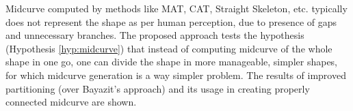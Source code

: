 
Midcurve computed by methods like MAT, CAT, Straight Skeleton, etc. typically does not represent the shape as per human perception, due to presence of gaps and unnecessary branches.  The proposed approach tests the hypothesis (Hypothesis \ref{hyp:midcurve}) that instead of computing midcurve of the whole shape in one go, one can divide the shape in more manageable, simpler shapes, for which midcurve generation is a way simpler problem. The results of improved partitioning (over Bayazit's \cite{Bayazit} approach) and its usage in creating properly connected midcurve are shown.
